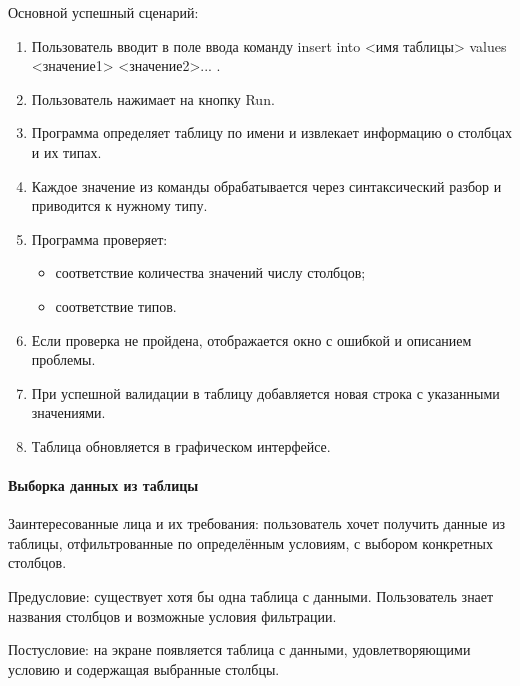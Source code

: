 Основной успешный сценарий:
\begin{enumerate}
	\item Пользователь вводит в поле ввода команду insert into <имя таблицы> values <значение1> <значение2>... .	
	\item Пользователь нажимает на кнопку Run.	
	\item Программа определяет таблицу по имени и извлекает информацию о столбцах и их типах.	
	\item Каждое значение из команды обрабатывается через синтаксический разбор и приводится к нужному типу.	
	\item Программа проверяет:
	\begin{itemize}
		\item соответствие количества значений числу столбцов;	
		\item соответствие типов.
	\end{itemize}
	\item Если проверка не пройдена, отображается окно с ошибкой и описанием проблемы.	
	\item При успешной валидации в таблицу добавляется новая строка с указанными значениями.	
	\item Таблица обновляется в графическом интерфейсе.
\end{enumerate}

\paragraph{Выборка данных из таблицы}

Заинтересованные лица и их требования: пользователь хочет получить данные из таблицы, отфильтрованные по определённым условиям, с выбором конкретных столбцов.

Предусловие: существует хотя бы одна таблица с данными. Пользователь знает названия столбцов и возможные условия фильтрации.

Постусловие: на экране появляется таблица с данными, удовлетворяющими условию и содержащая выбранные столбцы.

